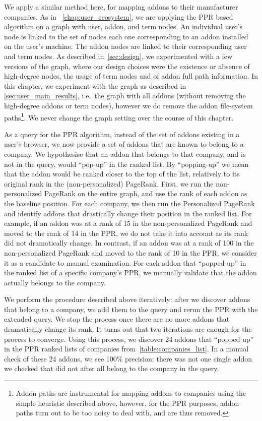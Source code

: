 \documentclass[11pt,oneside]{book}
\begin{document}
We apply a similar method here, for mapping addons to their manufacturer companies. 
As in ~\autoref{chap:user_ecosystem}, we are applying the PPR based algorithm on a graph with user, addon, and term nodes. An individual user's node is linked to the set of nodes each one corresponding to an addon installed on the user's machine. The addon nodes are linked to their corresponding user and term nodes. As described in~\autoref{sec:design}, we experimented with a few versions of the graph, where our design choices were the existence or absence of high-degree nodes, the usage of term nodes and of addon full path information. In this chapter, we experiment with the graph as described in \autoref{sec:user_main_results}, i.e.~the graph with all addons (without removing the high-degree addons or term nodes), however we do remove the addon file-system paths\footnote{Addon paths are instrumental for mapping addons to companies using the simple heuristic described above, however, for the PPR purposes, addon paths turn out to be too noisy to deal with, and are thus removed.}. We never change the graph setting over the course of this chapter.

As a query for the PPR algorithm, instead of the set of addons existing in a user's browser, we now provide a set of addons that are known to belong to a company. We hypothesise that an addon that belongs to that company, and is not in the query, would ``pop-up'' in the ranked list. By ``popping-up'' we mean that the addon would be ranked closer to the top of the list, relatively to its original rank in the (non-personalized) PageRank. First, we run the non-personalized PageRank on the entire graph, and use the rank of each addon as the baseline position. For each company, we then run the Personalized PageRank and identify addons that drastically change their position in the ranked list. For example, if an addon was at a rank of 15 in the non-personalized PageRank and moved to the rank of 14 in the PPR, we do not take it into account as its rank did not dramatically change. In contrast, if an addon was at a rank of 100 in the non-personalized PageRank and moved to the rank of 10 in the PPR, we consider it as a candidate to manual examination. For each addon that ``popped-up'' in the ranked list of a specific company's PPR, we manually validate that the addon actually belongs to the company.

We perform the procedure described above iteratively: after we discover addons that belong to a company, we add them to the query and rerun the PPR with the extended query. We stop the process once there are no more addons that dramatically change its rank. It turns out that two iterations are enough for the process to converge. Using this process, we discover 24 addons that ``popped up'' in the PPR ranked lists of companies from~\autoref{table:companies_list}. In a manual check of these 24 addons, we see 100\% precision: there was not one single addon we checked that did not after all belong to the company in the query. 
\end{document}
